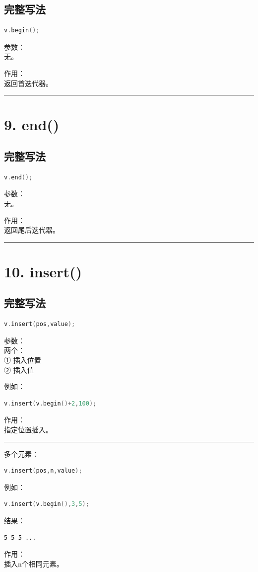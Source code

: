 \documentclass[10pt,twocolumn]{extarticle}
\begin{document}
\subsection{完整写法}
\begin{lstlisting}[language=C++]
v.begin();
\end{lstlisting}
参数：\\
无。

作用：\\
返回首迭代器。

\noindent\rule{\linewidth}{0.4pt}

\section{9. end()}

\subsection{完整写法}
\begin{lstlisting}[language=C++]
v.end();
\end{lstlisting}
参数：\\
无。

作用：\\
返回尾后迭代器。

\noindent\rule{\linewidth}{0.4pt}

\section{10. insert()}

\subsection{完整写法}
\begin{lstlisting}[language=C++]
v.insert(pos,value);
\end{lstlisting}
参数：\\
两个：\\
① 插入位置\\
② 插入值

例如：
\begin{lstlisting}[language=C++]
v.insert(v.begin()+2,100);
\end{lstlisting}
作用：\\
指定位置插入。

\noindent\rule{\linewidth}{0.4pt}

多个元素：
\begin{lstlisting}[language=C++]
v.insert(pos,n,value);
\end{lstlisting}
例如：
\begin{lstlisting}[language=C++]
v.insert(v.begin(),3,5);
\end{lstlisting}
结果：
\begin{lstlisting}
5 5 5 ...
\end{lstlisting}
作用：\\
插入n个相同元素。
\end{document}
